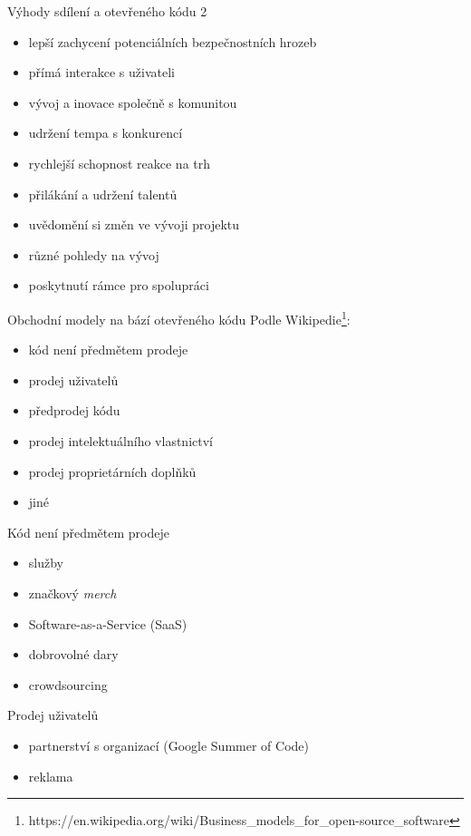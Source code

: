 \documentclass[11pt]{beamer}
\begin{document}
\begin{frame}{Výhody sdílení a otevřeného kódu 2}
	\begin{itemize}
		\item lepší zachycení potenciálních bezpečnostních hrozeb
		\item přímá interakce s uživateli
		\item vývoj a inovace společně s komunitou
		\item udržení tempa s konkurencí
		\item rychlejší schopnost reakce na trh
		\item přilákání a udržení talentů
		\item uvědomění si změn ve vývoji projektu
		\item různé pohledy na vývoj
		\item poskytnutí rámce pro spolupráci
	\end{itemize}
\end{frame}

\begin{frame}{Obchodní modely na bází otevřeného kódu}
	Podle Wikipedie\footnote{https://en.wikipedia.org/wiki/Business\_models\_for\_open-source\_software}:
 \begin{itemize}
		\item kód není předmětem prodeje
		\item prodej uživatelů
		\item předprodej kódu
		\item prodej intelektuálního vlastnictví
		\item prodej proprietárních doplňků
		\item jiné
 \end{itemize}
\end{frame}

\begin{frame}{Kód není předmětem prodeje}
	\begin{itemize}
		\item služby
		\item značkový \textit{merch}
		\item Software-as-a-Service (SaaS)
		\item dobrovolné dary
		\item crowdsourcing
	\end{itemize}
\end{frame}

\begin{frame}{Prodej uživatelů}
	\begin{itemize}
		\item partnerství s organizací (Google Summer of Code)
		\item reklama
	\end{itemize}
\end{frame}
\end{document}
